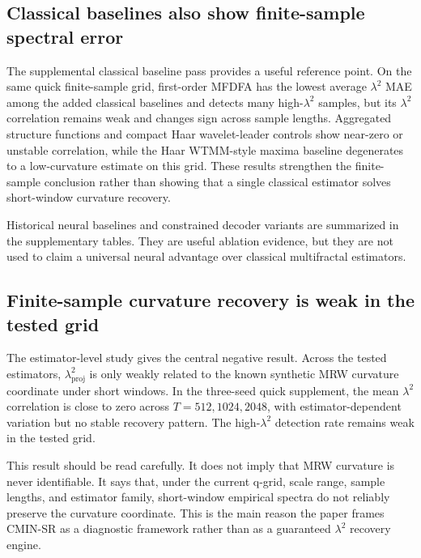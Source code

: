 

\subsection{Classical baselines also show finite-sample spectral error}

The supplemental classical baseline pass provides a useful reference point.
On the same quick finite-sample grid, first-order MFDFA has the lowest average
\(\lambda^2\) MAE among the added classical baselines and detects many
high-\(\lambda^2\) samples, but its \(\lambda^2\) correlation remains weak and
changes sign across sample lengths. Aggregated structure functions and compact
Haar wavelet-leader controls show near-zero or unstable correlation, while the
Haar WTMM-style maxima baseline degenerates to a low-curvature estimate on this
grid. These results strengthen the finite-sample conclusion rather than
showing that a single classical estimator solves short-window curvature
recovery.



Historical neural baselines and constrained decoder variants are summarized in
the supplementary tables. They are useful ablation evidence, but they are not
used to claim a universal neural advantage over classical multifractal
estimators.

\subsection{Finite-sample curvature recovery is weak in the tested grid}

The estimator-level study gives the central negative result. Across the tested
estimators, \(\lambda^2_{\mathrm{proj}}\) is only weakly related to the known
synthetic MRW curvature coordinate under short windows. In the
three-seed quick supplement, the mean \(\lambda^2\) correlation is close to
zero across \(T=512,1024,2048\), with estimator-dependent variation but no
stable recovery pattern. The high-\(\lambda^2\) detection rate remains weak in
the tested grid.

This result should be read carefully. It does not imply that MRW curvature is
never identifiable. It says that, under the current q-grid, scale range,
sample lengths, and estimator family, short-window empirical spectra do not
reliably preserve the curvature coordinate. This is the main reason the paper
frames CMIN-SR as a diagnostic framework rather than as a guaranteed
\(\lambda^2\) recovery engine.

